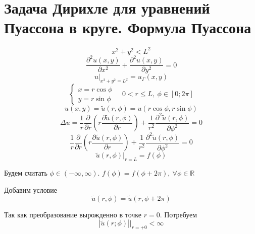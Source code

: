 \documentclass[a4paper]{article}
\theoremstyle{definition}
\theoremstyle{remark}
\begin{document}
\section*{Задача Дирихле для уравнений Пуассона в круге. Формула Пуассона}
\[
    x^2 + y^2 < L^2
\]
\[
    \frac{\partial^{2} u(x,y)}{\partial x^2} + \frac{\partial^{2} u(x,y)}{\partial y^2}
    = 0
\]
\[
    u\big|_{x^2+y^2=L^2} = u_{\Gamma}(x,y)
\]
\[
    \begin{cases}
        x = r\cos \phi\\
        y = r \sin \phi
    \end{cases} \quad
    0 < r \leq L, \ \phi \in [0; 2\pi]
\]
\[
    u(x,y) = \widetilde{u}(r,\phi) = u(r\cos \phi, r\sin \phi)
\]
\[
    \Delta u = \frac{1}{r} \frac{\partial}{\partial r} \left( r
    \frac{\partial \widetilde{u}(r,\phi)}{\partial r} \right)
    + \frac{1}{r^2} \frac{\partial^{2} \widetilde{u}(r,\phi)}{\partial \phi^2} 
    = 0
\]
\begin{equation}
    \frac{1}{r} \frac{\partial}{\partial r} \left( r
    \frac{\partial \widetilde{u}(r,\phi)}{\partial r} \right)
    + \frac{1}{r^2} \frac{\partial^{2} \widetilde{u}(r,\phi)}{\partial \phi^2} 
    = 0
\end{equation}
\begin{equation}
    \widetilde{u}(r,\phi) \big|_{r = L} = f(\phi)
\end{equation}

Будем считать $ \phi \in (-\infty, \infty) $. $ f(\phi) = f(\phi + 2\pi),
\ \forall \phi \in \mathbb{R} $  

Добавим условие
\begin{equation}
    \widetilde{u}(r,\phi) = \widetilde{u}(r,\phi + 2\pi)
\end{equation}

Так как преобразование вырожденно в точке $ r = 0 $. Потребуем
\begin{equation}
    |\widetilde{u}(r;\phi)| \bigg|_{r = +0} < \infty
\end{equation}
\end{document}
